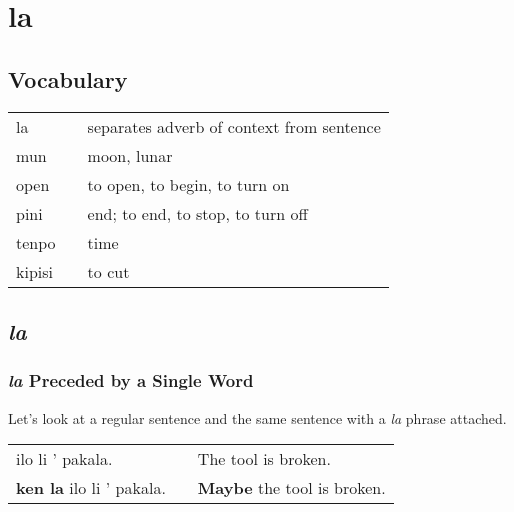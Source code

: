\section{la}
%
\subsection*{Vocabulary}
%
\begin{supertabular}{p{5,5cm}|ll}
la && separates adverb of context from sentence \\
mun && moon, lunar  \\
open && to open, to begin, to turn on \\
pini && end; to end, to stop, to turn off \\
tenpo && time \\
kipisi &&  to cut \\
\end{supertabular} 
%
\subsection*{\textit{la}}
%
\subsubsection*{\textit{la} Preceded by a Single Word}
%
Let's look at a regular sentence and the same sentence with a \textit{la} phrase attached. 

\begin{supertabular}{p{5,5cm}|ll}
ilo li ' pakala. && The tool is broken. \\
\textbf{ken la} ilo li ' pakala. && \textbf{Maybe} the tool is broken. \\
\end{supertabular} 

